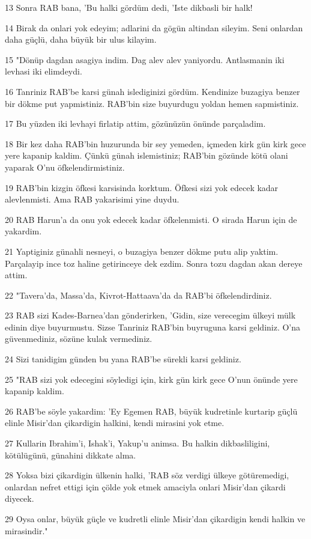 \par 13 Sonra RAB bana, 'Bu halki gördüm dedi, 'Iste dikbasli bir halk!
\par 14 Birak da onlari yok edeyim; adlarini da gögün altindan sileyim. Seni onlardan daha güçlü, daha büyük bir ulus kilayim.
\par 15 "Dönüp dagdan asagiya indim. Dag alev alev yaniyordu. Antlasmanin iki levhasi iki elimdeydi.
\par 16 Tanriniz RAB'be karsi günah islediginizi gördüm. Kendinize buzagiya benzer bir dökme put yapmistiniz. RAB'bin size buyurdugu yoldan hemen sapmistiniz.
\par 17 Bu yüzden iki levhayi firlatip attim, gözünüzün önünde parçaladim.
\par 18 Bir kez daha RAB'bin huzurunda bir sey yemeden, içmeden kirk gün kirk gece yere kapanip kaldim. Çünkü günah islemistiniz; RAB'bin gözünde kötü olani yaparak O'nu öfkelendirmistiniz.
\par 19 RAB'bin kizgin öfkesi karsisinda korktum. Öfkesi sizi yok edecek kadar alevlenmisti. Ama RAB yakarisimi yine duydu.
\par 20 RAB Harun'a da onu yok edecek kadar öfkelenmisti. O sirada Harun için de yakardim.
\par 21 Yaptiginiz günahli nesneyi, o buzagiya benzer dökme putu alip yaktim. Parçalayip ince toz haline getirinceye dek ezdim. Sonra tozu dagdan akan dereye attim.
\par 22 "Tavera'da, Massa'da, Kivrot-Hattaava'da da RAB'bi öfkelendirdiniz.
\par 23 RAB sizi Kades-Barnea'dan gönderirken, 'Gidin, size verecegim ülkeyi mülk edinin diye buyurmustu. Sizse Tanriniz RAB'bin buyruguna karsi geldiniz. O'na güvenmediniz, sözüne kulak vermediniz.
\par 24 Sizi tanidigim günden bu yana RAB'be sürekli karsi geldiniz.
\par 25 "RAB sizi yok edecegini söyledigi için, kirk gün kirk gece O'nun önünde yere kapanip kaldim.
\par 26 RAB'be söyle yakardim: 'Ey Egemen RAB, büyük kudretinle kurtarip güçlü elinle Misir'dan çikardigin halkini, kendi mirasini yok etme.
\par 27 Kullarin Ibrahim'i, Ishak'i, Yakup'u animsa. Bu halkin dikbasliligini, kötülügünü, günahini dikkate alma.
\par 28 Yoksa bizi çikardigin ülkenin halki, 'RAB söz verdigi ülkeye götüremedigi, onlardan nefret ettigi için çölde yok etmek amaciyla onlari Misir'dan çikardi diyecek.
\par 29 Oysa onlar, büyük güçle ve kudretli elinle Misir'dan çikardigin kendi halkin ve mirasindir."

